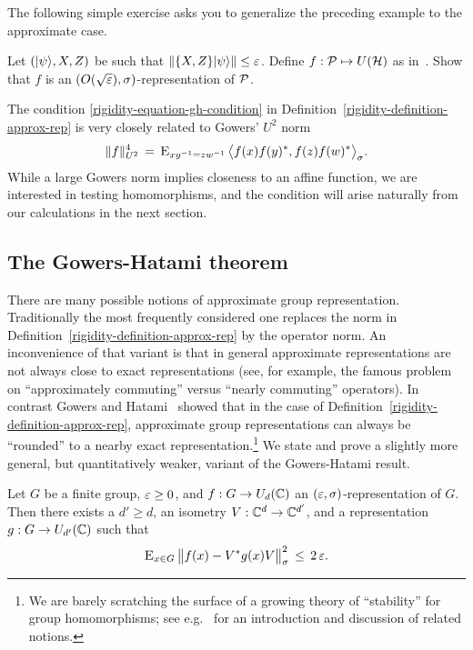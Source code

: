 The following simple exercise asks you to generalize the preceding example to the approximate case. 

\begin{exercise}
\label{exercise-wh-2}
Let $(|\psi\rangle,X,Z)$ be such that $\|\{X,Z\}|\psi\rangle\|\leq \varepsilon$. Define $f:\mathcal{P} \mapsto U(\mathcal{H})$ as in~. Show that $f$ is an $(O(\sqrt{\varepsilon}),\sigma)$-representation of $\mathcal{P}$. 
\end{exercise}

\begin{remark}
The condition \eqref{rigidity-equation-gh-condition} in Definition~\ref{rigidity-definition-approx-rep} is very closely related to Gowers' $U^2$ norm
$$\|f\|_{U^2}^4 \,=\, \textsc{E}_{xy^{-1}=zw^{-1}}\, \big\langle f(x)f(y)^* ,f(z)f(w)^* \big\rangle_\sigma.$$
While a large Gowers norm implies closeness to an affine function, we are interested in testing homomorphisms, and the condition  will arise naturally from our calculations in the next section. 
\end{remark}

\subsection{The Gowers-Hatami theorem}
\label{subsection-gowers-hatami-theorem}

There are many possible notions of approximate group representation. Traditionally the most frequently considered one replaces the norm in Definition~\ref{rigidity-definition-approx-rep} by the operator norm. An inconvenience of that variant is that in general approximate representations are not always close to exact representations (see, for example, the famous problem on ``approximately commuting'' versus ``nearly commuting'' operators). In contrast 
Gowers and Hatami~\cite{gowers2017inverse} showed that in the case of Definition~\ref{rigidity-definition-approx-rep}, approximate group representations can always be ``rounded'' to a nearby exact representation.\footnote{We are barely scratching the surface of a growing theory of ``stability'' for group homomorphisms; see e.g.~\cite{becker2020stability} for an introduction and discussion of related notions.} 
We state and prove a slightly more general, but quantitatively weaker, variant of the Gowers-Hatami result.

\begin{theorem}
\label{theorem-gh}
Let $G$ be a finite group, $\varepsilon\geq 0$, and $f:G\to U_d(\mathbb{C})$ an $(\varepsilon,\sigma)$-representation of $G$. Then there exists a $d'\geq d$, an isometry $V:\mathbb{C}^d\to \mathbb{C}^{d'}$, and a representation $g:G\to U_{d'}(\mathbb{C})$ such that 
$$\textsc{E}_{x\in G}\, \big\| f(x) - V^*g(x)V \big\|_\sigma^2\, \leq\, 2\,\varepsilon.$$ 
\end{theorem}


